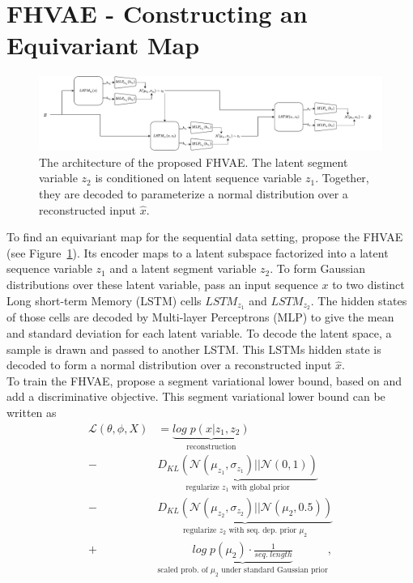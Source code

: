 \documentclass{article} %
\begin{document}
\section*{FHVAE - Constructing an Equivariant Map}
\begin{figure}
	\centering
	\includegraphics[width=1\linewidth]{../figures/fhvae_complete.pdf}
	\caption{The architecture of the proposed FHVAE. The latent segment variable $z_2$ is conditioned on latent sequence variable $z_1$. Together, they are decoded to parameterize a normal distribution over a reconstructed input $\hat{x}$.}
	\label{fig:fhave}
\end{figure} 
To find an equivariant map for the sequential data setting, \citet{hsu2017unsupervised} propose the FHVAE (see Figure~\ref{fig:fhave}). Its encoder maps to a latent subspace factorized into a latent sequence variable $z_1$ and a latent segment variable $z_2$. To form Gaussian distributions over these latent variable, \citet{hsu2017unsupervised} pass an input sequence $x$ to two distinct Long short-term Memory (LSTM) \cite{hochreiter1997long} cells $LSTM_{z_1}$ and $LSTM_{z_2}$. The hidden states of those cells are decoded by Multi-layer Perceptrons (MLP) to give the mean and standard deviation for each latent variable. To decode the latent space, a sample is drawn and passed to another LSTM. This LSTMs hidden state is decoded to form a normal distribution over a reconstructed input $\hat{x}$.\\
To train the FHVAE, \citet{hsu2017unsupervised} propose a segment variational lower bound, based on \citet{kingma2013auto} and add a discriminative objective. This segment variational lower bound can be written as
\begin{align*}
\mathcal{L}(\theta, \phi, X)& = %
\underbrace{log\;p(x|z_1, z_2)}_{\text{reconstruction}}\\%
-&\underbrace{D_{KL}(\mathcal{N}(\mu_{z_1}, \sigma_{z_1})||\mathcal{N}(0,1))}_{\text{regularize $z_1$ with global prior}}\\
-&\underbrace{D_{KL}(\mathcal{N}(\mu_{z_2}, \sigma_{z_2})||\mathcal{N}(\mu_2,0.5))}_{\text{regularize $z_2$ with seq. dep. prior $\mu_2$}}\\
+&\underbrace{log\;p(\mu_2) \cdot \frac{1}{seq.\;length}}_{\text{scaled prob. of $\mu_2$ under standard Gaussian prior}}, 
\end{align*}
\end{document}

